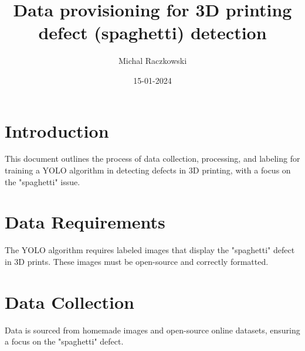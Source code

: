 \documentclass[12pt,a4paper]{article}
\title{\textbf{Data provisioning for 3D printing defect (spaghetti) detection }}
\author{Michal Raczkowski}
\date{15-01-2024}
\begin{document}
\maketitle
\thispagestyle{empty} %

\newpage
\tableofcontents
\newpage

\setcounter{page}{1} %

\section{Introduction}
This document outlines the process of data collection, processing, and labeling for training a YOLO algorithm in detecting defects in 3D printing, with a focus on the "spaghetti" issue.

\section{Data Requirements}
The YOLO algorithm requires labeled images that display the "spaghetti" defect in 3D prints. These images must be open-source and correctly formatted.

\section{Data Collection}
Data is sourced from homemade images and open-source online datasets, ensuring a focus on the "spaghetti" defect.
\end{document}
